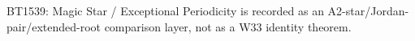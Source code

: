 \begin{center}\small
BT1539: Magic Star / Exceptional Periodicity is recorded as an A2-star/Jordan-pair/extended-root comparison layer, not as a W33 identity theorem.
\end{center}
